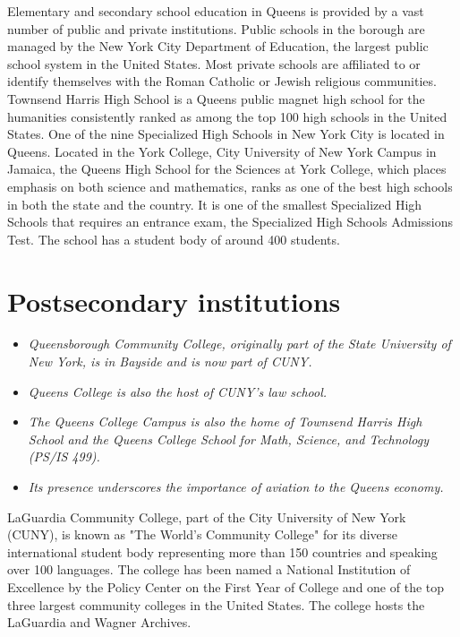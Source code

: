 Elementary and secondary school education in Queens is provided by a
vast number of public and private institutions. Public schools in the
borough are managed by the New York City Department of Education, the
largest public school system in the United States. Most private schools
are affiliated to or identify themselves with the Roman Catholic or
Jewish religious communities. Townsend Harris High School is a Queens
public magnet high school for the humanities consistently ranked as
among the top 100 high schools in the United States. One of the nine
Specialized High Schools in New York City is located in Queens. Located
in the York College, City University of New York Campus in Jamaica, the
Queens High School for the Sciences at York College, which places
emphasis on both science and mathematics, ranks as one of the best high
schools in both the state and the country. It is one of the smallest
Specialized High Schools that requires an entrance exam, the Specialized
High Schools Admissions Test. The school has a student body of around
400 students.

\section{Postsecondary institutions}\label{postsecondary-institutions}

\begin{itemize}
\item
  \emph{Queensborough Community College, originally part of the State
  University of New York, is in Bayside and is now part of CUNY.}
\item
  \emph{Queens College is also the host of CUNY's law school.}
\item
  \emph{The Queens College Campus is also the home of Townsend Harris
  High School and the Queens College School for Math, Science, and
  Technology (PS/IS 499).}
\item
  \emph{Its presence underscores the importance of aviation to the
  Queens economy.}
\end{itemize}

LaGuardia Community College, part of the City University of New York
(CUNY), is known as "The World's Community College" for its diverse
international student body representing more than 150 countries and
speaking over 100 languages. The college has been named a National
Institution of Excellence by the Policy Center on the First Year of
College and one of the top three largest community colleges in the
United States. The college hosts the LaGuardia and Wagner Archives.

